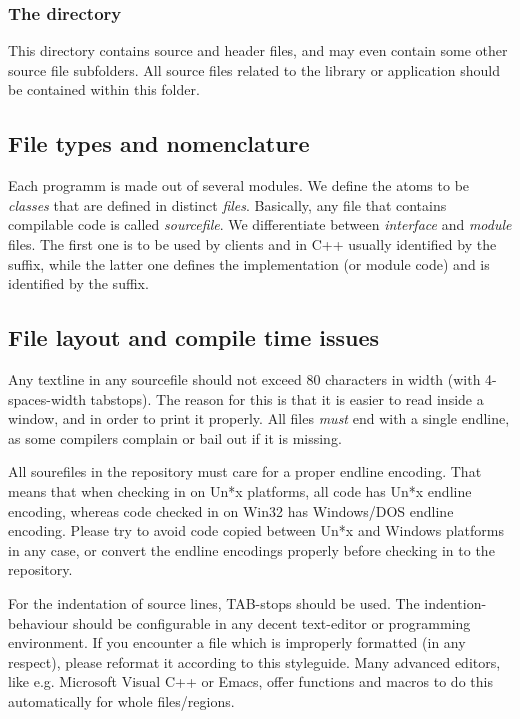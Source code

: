 \subsubsection{The  directory}
This directory contains source and header files, and may even contain some other source file subfolders.
All source files related to the library or application should be contained within this folder.


\subsection{File types and nomenclature}
Each programm is made out of several modules.
We define the atoms to be \emph{classes} that are defined in distinct \emph{files}.
Basically, any file that contains compilable code is called \emph{sourcefile}.
We differentiate between \emph{interface} and \emph{module} files.
The first one is to be used by clients and in C++ usually identified by the  suffix,  while the latter one defines the implementation (or module code) and is identified by the  suffix.

\subsection{File layout and compile time issues}

Any textline in any sourcefile should not exceed 80 characters in width (with 4-spaces-width tabstops).
The reason for this is that it is easier to read inside a window, and in order to print it properly.
All files \emph{must} end with a single endline, as some compilers complain or bail out if it is missing.

All sourefiles in the repository must care for a proper endline encoding.
That means that when checking in on Un*x platforms, all code has Un*x endline encoding, whereas code checked in on Win32 has Windows/DOS endline encoding.
Please try to avoid code copied between Un*x and Windows platforms in any case, or convert the endline encodings properly before checking in to the repository.


For the indentation of source lines, TAB-stops should be used.
The indention-behaviour should be configurable in any decent text-editor or programming environment.
If you encounter a file which is improperly formatted (in any respect), please reformat it according to this styleguide.
Many advanced editors, like e.g. Microsoft Visual C++ or Emacs, offer functions and macros to do this automatically for whole files/regions.


